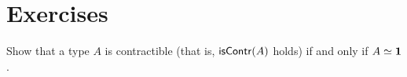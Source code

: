 


\section*{Exercises}

\begin{ex}
  Show that a type $A$ is contractible (that is, $\mathsf{isContr}(A)$ holds) if and only if $A\simeq\mathbf{1}$.
\end{ex}

